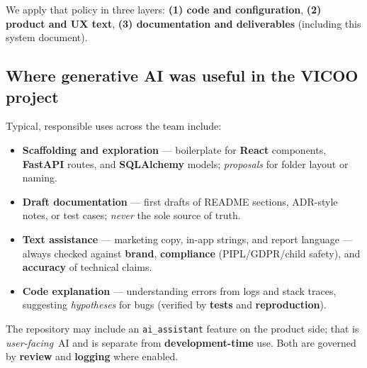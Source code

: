 \documentclass[11pt,a4paper]{article}
\begin{document}
We apply that policy in three layers: \textbf{(1) code and configuration}, \textbf{(2) product and UX text}, \textbf{(3) documentation and deliverables} (including this system document).

\subsection{Where generative AI was useful in the VICOO project}

Typical, responsible uses across the team include:
\begin{itemize}
  \item \textbf{Scaffolding and exploration} --- boilerplate for \textbf{React} components, \textbf{FastAPI} routes, and \textbf{SQLAlchemy} models; \emph{proposals} for folder layout or naming.
  \item \textbf{Draft documentation} --- first drafts of README sections, ADR-style notes, or test cases; \emph{never} the sole source of truth.
  \item \textbf{Text assistance} --- marketing copy, in-app strings, and report language --- always checked against \textbf{brand}, \textbf{compliance} (PIPL/GDPR/child safety), and \textbf{accuracy} of technical claims.
  \item \textbf{Code explanation} --- understanding errors from logs and stack traces, suggesting \emph{hypotheses} for bugs (verified by \textbf{tests} and \textbf{reproduction}).
\end{itemize}

The repository may include an \texttt{ai\_assistant} feature on the product side; that is \emph{user-facing}~AI and is separate from \textbf{development-time} use. Both are governed by \textbf{review} and \textbf{logging} where enabled.
\end{document}
